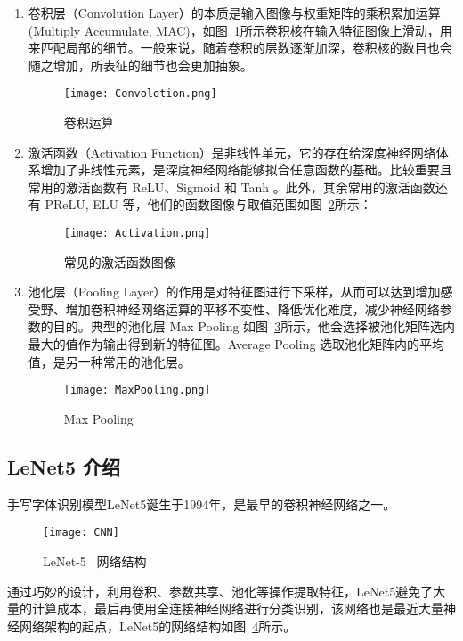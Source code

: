\begin{enumerate}
    \item 卷积层（Convolution Layer）的本质是输入图像与权重矩阵的乘积累加运算(Multiply Accumulate, MAC)，如图~\ref{fig:Convolution}所示卷积核在输入特征图像上滑动，用来匹配局部的细节。一般来说，随着卷积的层数逐渐加深，卷积核的数目也会随之增加，所表征的细节也会更加抽象。
    \begin{figure}[!htbp]
        \centering
        \texttt{[image: Convolotion.png]}
        \caption{卷积运算}
        \label{fig:Convolution}
    \end{figure}
    \item 激活函数（Activation Function）是非线性单元，它的存在给深度神经网络体系增加了非线性元素，是深度神经网络能够拟合任意函数的基础。比较重要且常用的激活函数有 ReLU、Sigmoid 和 Tanh 。此外，其余常用的激活函数还有 PReLU, ELU 等，他们的函数图像与取值范围如图~\ref{fig:Activation}所示：
    \begin{figure}[!htbp]
        \centering
        \texttt{[image: Activation.png]}
        \caption{常见的激活函数图像}
        \label{fig:Activation}
    \end{figure}
    \item 池化层（Pooling Layer）的作用是对特征图进行下采样，从而可以达到增加感受野、增加卷积神经网络运算的平移不变性、降低优化难度，减少神经网络参数的目的。典型的池化层 Max Pooling 如图~\ref{fig:MaxPooling}所示，他会选择被池化矩阵选内最大的值作为输出得到新的特征图。Average Pooling 选取池化矩阵内的平均值，是另一种常用的池化层。
    \begin{figure}[!htbp]
        \centering
        \texttt{[image: MaxPooling.png]}
        \caption{Max Pooling}
        \label{fig:MaxPooling}
    \end{figure}
\end{enumerate}

\subsection{LeNet5 介绍}

手写字体识别模型LeNet5\cite{726791}诞生于1994年，是最早的卷积神经网络之一。

\begin{figure}[!htbp]
    \centering
    \texttt{[image: CNN]}
    \caption{LeNet-5 \ 网络结构}
    \label{fig:CNN}
\end{figure}

通过巧妙的设计，利用卷积、参数共享、池化等操作提取特征，LeNet5避免了大量的计算成本，最后再使用全连接神经网络进行分类识别，该网络也是最近大量神经网络架构的起点，LeNet5的网络结构如图~\ref{fig:CNN}所示。

